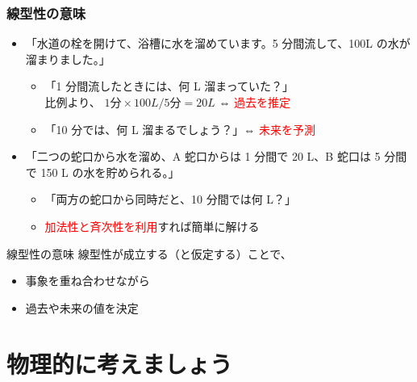 \documentclass[12pt, dvipdfmx]{beamer}
\begin{document}
\begin{frame}
	\frametitle{線型性の意味}
		\begin{itemize}
			\item 「水道の栓を開けて、浴槽に水を溜めています。5 分間流して、100L の水が溜まりました。」
			\begin{itemize}
				\item 「1 分間流したときには、何 L 溜まっていた？」\\
				比例より、 $1 \text{分} \times 100 L /5 \text{分}= 20 L$ ⇔ \textcolor{red}{過去を推定}
				\item「10 分では、何 L 溜まるでしょう？」⇔ \textcolor{red}{未来を予測}
			\end{itemize}
			\item 「二つの蛇口から水を溜め、A 蛇口からは 1 分間で 20 L、B 蛇口は 5 分間で 150 L の水を貯められる。」
			\begin{itemize}
				\item 「両方の蛇口から同時だと、10 分間では何 L？」
				\item \textcolor{red}{加法性と斉次性を利用}すれば簡単に解ける
			\end{itemize}
		\end{itemize}
		\begin{alertblock}{線型性の意味}
			線型性が成立する（と仮定する）ことで、
			\begin{itemize}
				\item 事象を重ね合わせながら
				\item 過去や未来の値を決定
			\end{itemize}
		\end{alertblock}
\end{frame}

\section{物理的に考えましょう}
\end{document}
